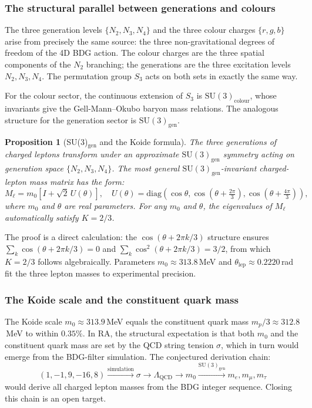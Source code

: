 \documentclass[11pt]{article}
\newtheorem{proposition}{Proposition}
\begin{document}
\subsubsection{The structural parallel between generations and colours}

The three generation levels $\{N_2,N_3,N_4\}$ and the three colour charges $\{r,g,b\}$ arise from precisely the same source: the three non-gravitational degrees of freedom of the 4D BDG action. The colour charges are the three spatial components of the $N_2$ branching; the generations are the three excitation levels $N_2,N_3,N_4$. The permutation group $S_3$ acts on both sets in exactly the same way.

For the colour sector, the continuous extension of $S_3$ is $\mathrm{SU}(3)_{\mathrm{colour}}$, whose invariants give the Gell-Mann--Okubo baryon mass relations. The analogous structure for the generation sector is $\mathrm{SU}(3)_{\mathrm{gen}}$.

\begin{proposition}[SU(3)$_{\mathrm{gen}}$ and the Koide formula]
The three generations of charged leptons transform under an approximate $\mathrm{SU}(3)_{\mathrm{gen}}$ symmetry acting on generation space $\{N_2,N_3,N_4\}$. The most general $\mathrm{SU}(3)_{\mathrm{gen}}$-invariant charged-lepton mass matrix has the form:
\begin{equation}
M_\ell = m_0\left[I+\sqrt{2}\,U(\theta)\right], \quad U(\theta)=\mathrm{diag}\!\left(\cos\theta,\cos(\theta+\tfrac{2\pi}{3}),\cos(\theta+\tfrac{4\pi}{3})\right),
\end{equation}
where $m_0$ and $\theta$ are real parameters. For any $m_0$ and $\theta$, the eigenvalues of $M_\ell$ automatically satisfy $K=2/3$.
\end{proposition}

The proof is a direct calculation: the $\cos(\theta+2\pi k/3)$ structure ensures $\sum_k\cos(\theta+2\pi k/3)=0$ and $\sum_k\cos^2(\theta+2\pi k/3)=3/2$, from which $K=2/3$ follows algebraically. Parameters $m_0\approx 313.8$\,MeV and $\theta_{\mathrm{lep}}\approx 0.2220$\,rad fit the three lepton masses to experimental precision.

\subsubsection{The Koide scale and the constituent quark mass}

The Koide scale $m_0\approx 313.9$\,MeV equals the constituent quark mass $m_p/3\approx 312.8$\,MeV to within $0.35\%$. In RA, the structural expectation is that both $m_0$ and the constituent quark mass are set by the QCD string tension $\sigma$, which in turn would emerge from the BDG-filter simulation. The conjectured derivation chain:
\begin{equation}
(1,-1,9,-16,8)\xrightarrow{\text{simulation}}\sigma\longrightarrow\Lambda_{\mathrm{QCD}}\longrightarrow m_0\xrightarrow{\mathrm{SU}(3)_{\mathrm{gen}}}m_e,m_\mu,m_\tau
\end{equation}
would derive all charged lepton masses from the BDG integer sequence. Closing this chain is an open target.
\end{document}
